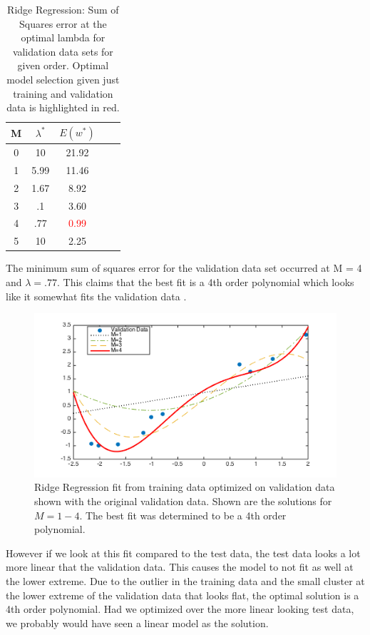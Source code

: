 \documentclass[10pt,twocolumn]{article}
\begin{document}
\begin{table}[H]
\begin{center}
  \begin{tabular}{ | c | c | c | c | c | }
    \hline
     M & $\lambda ^*$  &$ E(w^*)$ \\ \hline
     0 & 10 & 21.92  \\ \hline
     1 & 5.99 & 11.46   \\ \hline
     2 &1.67 & 8.92   \\ \hline
     3 & .1 & 3.60   \\ \hline
     4 & .77 & \textcolor{red}{0.99}   \\ \hline
     5 & 10 & 2.25  \\ \hline    
    \hline
  \end{tabular}
  \caption{Ridge Regression:  Sum of Squares error at the optimal lambda for validation data sets for given order. Optimal model selection given just training and validation data is highlighted in red. }
\end{center}
\label{table:ave_sse}
\end{table}



The minimum sum of squares error for the validation data set occurred at M = 4 and $\lambda = .77$. This claims that the best fit is a 4th order polynomial which looks like it somewhat fits the validation data .
\begin{figure}[H]
\center
\includegraphics[scale =.5]{modelcomparison.png}
\caption{Ridge Regression fit from training data optimized on validation data shown with the original validation data. Shown are the solutions for $M=1-4$. The best fit was determined to be a 4th order polynomial.}
\end{figure}

However if we look at this fit compared to the test data, the test data looks a lot more linear that the validation data. This causes the model to not fit as well at the lower extreme.  Due to the outlier in the training data and the small cluster at the lower extreme of the validation data that looks flat, the optimal solution is a 4th order polynomial. Had we optimized over the more linear looking test data, we probably would have seen a linear model as the solution. 
\end{document}
